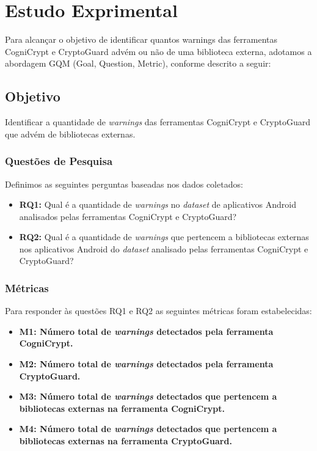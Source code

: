 \section{Estudo Exprimental}

Para alcançar o objetivo de identificar quantos warnings das ferramentas CogniCrypt e CryptoGuard advém ou não de uma biblioteca externa, adotamos a abordagem GQM (Goal, Question, Metric), conforme descrito a seguir:

\subsection{Objetivo}

Identificar a quantidade de \textit{warnings} das ferramentas CogniCrypt e CryptoGuard que advém de bibliotecas externas. 

\subsubsection{Questões de Pesquisa}
Definimos as seguintes perguntas baseadas nos dados coletados:

\begin{itemize}
\item \textbf{RQ1:} Qual é a quantidade de \textit{warnings} no \textit{dataset} de aplicativos Android analisados pelas ferramentas CogniCrypt e CryptoGuard?

\item \textbf{RQ2:} Qual é a quantidade de \textit{warnings} que pertencem a bibliotecas externas nos aplicativos Android do \textit{dataset} analisado pelas ferramentas CogniCrypt e CryptoGuard?

\end{itemize}

\subsubsection{Métricas}
Para responder às questões RQ1 e RQ2  as seguintes métricas foram estabelecidas:

\begin{itemize}
\item \textbf{M1: Número total de \textit{warnings} detectados pela ferramenta CogniCrypt.} \
\item \textbf{M2: Número total de \textit{warnings} detectados pela ferramenta CryptoGuard.} \
\item \textbf{M3: Número total de \textit{warnings} detectados que pertencem a bibliotecas externas na ferramenta CogniCrypt.} \
\item \textbf{M4: Número total de \textit{warnings} detectados que pertencem a bibliotecas externas na ferramenta CryptoGuard.} \
\end{itemize}

